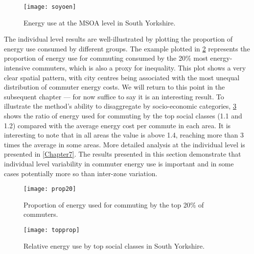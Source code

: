 \begin{figure}[htbp]
\begin{center}
    \texttt{[image: soyoen]}  \end{center}
  \caption[Energy use per commuter trip at the MSOA level in South Yorkshire]
  {Energy use at the MSOA level in South Yorkshire.}
 \label{fsoyoen}
\end{figure}

The individual level results are well-illustrated by plotting the proportion
of energy use consumed by different groups. The example plotted in
\cref{fineq20} represents the proportion of energy use for commuting
consumed by the 20\% most energy-intensive commuters, which is also a
proxy for inequality. This plot shows a very clear spatial pattern,
with city centres being associated with the most unequal distribution
of commuter energy costs. We will return to this point in the subsequent
chapter --- for now suffice to say it is an interesting result.
To illustrate the method's ability to disaggregate
by socio-economic categories, \cref{ftopprop} shows the ratio of energy
used for commuting by the top social classes (1.1 and 1.2) compared with
the average energy cost per commute in each area. It is interesting to
note that in all areas the value is above 1.4, reaching more than 3 times
the average in some areas. More detailed analysis at the individual
level is presented in \cref{Chapter7}. The results presented in this section
demonstrate that individual level variability in commuter energy use
is important and in some cases potentially more so than inter-zone variation.

\begin{figure}[htbp]
\begin{center}
    \texttt{[image: prop20]}  \end{center}
  \caption[Proportion of energy used for commuting by the top 20\%]
  {Proportion of energy used for commuting by the top 20\% of commuters.}
 \label{fineq20}
\end{figure}

\begin{figure}[htbp]
\begin{center}
    \texttt{[image: topprop]}  \end{center}
  \caption[Relative energy use by top social classes]
  {Relative energy use by top social classes in South Yorkshire.}
 \label{ftopprop}
\end{figure}

